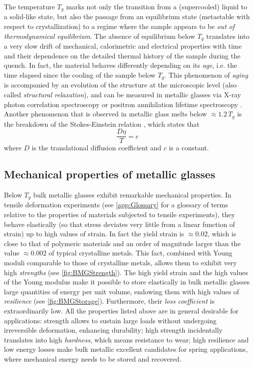 The temperature $T_{g}$ marks not only the transition from a (supercooled) liquid to a solid-like state, but also the passage from an equilibrium state (metastable with respect to crystallization) to a regime where the sample appears to be \emph{out of thermodynamical equilibrium}. The absence of equilibrium below $T_{g}$ translates into a very slow drift of mechanical, calorimetric and electrical properties \cite{luo2006aging, khonik2012comparative} with time and their dependence on the detailed thermal history of the sample during the quench. In fact, the material behaves differently depending on its \emph{age}, i.e. the time elapsed since the cooling of the sample below $T_{g}$. This phenomenon of \emph{aging} is accompanied by an evolution of the structure at the microscopic level (also called \emph{structural relaxation}), and can be measured in metallic glasses via X-ray photon correlation spectroscopy \cite{ruta2012atomic} or positron annihilation lifetime spectroscopy \cite{wang2005ageing}. \\
Another phenomenon that is observed in metallic glass melts below $\approx 1.2\, T_{g}$ is the breakdown of the Stokes-Einstein relation \cite{chathoth2010stokes}, which states that
\begin{equation}
	\frac{D\eta}{T} = c
	\label{eq:StokesEinstein}
\end{equation}
where $D$ is the translational diffusion coefficient and $c$ is a constant.

\subsection{Mechanical properties of metallic glasses \label{sec:DeformedGlasses}}

Below $T_{g}$ bulk metallic glasses exhibit remarkable mechanical properties. In tensile deformation experiments (see \autoref{app:Glossary} for a glossary of terms relative to the properties of materials subjected to tensile experiments), they behave elastically (so that stress deviates very little from a linear function of strain) up to high values of strain. In fact the yield strain is $\approx 0.02$, which is close to that of polymeric materials and an order of magnitude larger than the value $\approx 0.002$ of typical crystalline metals. This fact, combined with Young moduli comparable to those of crystalline metals, allows them to exhibit very high \emph{strengths} (see \autoref{fig:BMGStrength}). 
The high yield strain and the high values of the Young modulus make it possible to store elastically in bulk metallic glasses large quantities of energy per unit volume, endowing them with high values of \emph{resilience} (see \autoref{fig:BMGStorage}). Furthermore, their \emph{loss coefficient} is extraordinarily low. 
All the properties listed above are in general desirable for applications: strength allows to sustain large loads without undergoing irreversible deformation, enhancing durability; high strength incidentally translates into high \emph{hardness}, which means resistance to wear;
high resilience and low energy losses make bulk metallic excellent candidates for spring applications, where mechanical energy needs to be stored and recovered.

